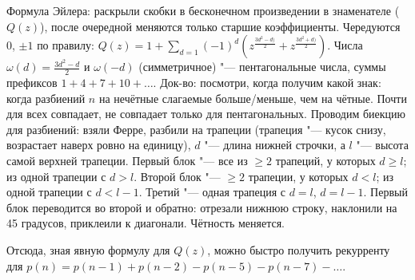 	Формула Эйлера: раскрыли скобки в бесконечном произведении в знаменателе ($Q(z)$),
	после очередной меняются только старшие коэффициенты.
	Чередуются 0, $\pm1$ по правилу: $Q(z)=1+\sum_{d=1} (-1)^d(z^{\frac{3d^2-d)}{2}}+z^{\frac{3d^2+d)}{2}})$.
	Числа $\omega(d)=\frac{3d^2-d}{2}$ и $\omega(-d)$ (симметричное) "--- пентагональные числа,
	суммы префиксов $1+4+7+10+\dots$.
	Док-во: посмотри, когда получим какой знак: когда разбиений $n$ на нечётные слагаемые больше/меньше,
	чем на чётные.
	Почти для всех совпадает, не совпадает только для пентагональных.
	Проводим биекцию для разбиений: взяли Ферре, разбили на трапеции (трапеция "--- кусок снизу,
	возрастает наверх ровно на единицу), $d$ "--- длина нижней строчки, а $l$ "--- высота самой верхней трапеции.
	Первый блок "--- все из $\ge 2$ трапеций, у которых $d \ge l$; из одной трапеции с $d > l$.
	Второй блок "--- $\ge 2$ трапеции, у которых $d < l$; из одной трапеции с $d < l-1$.
	Третий "--- одная трапеция с $d=l$, $d=l-1$.
	Первый блок переводится во второй и обратно: отрезали нижнюю строку, наклонили на 45 градусов, приклеили к диагонали.
	Чётность меняется.

	Отсюда, зная явную формулу для $Q(z)$, можно быстро получить рекурренту для $p(n)=p(n-1)+p(n-2)-p(n-5)-p(n-7)-\dots$.
